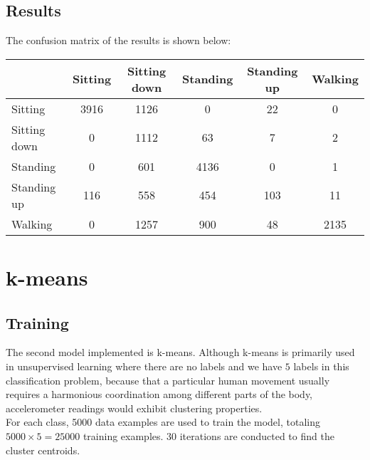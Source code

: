 \documentclass[a4paper, 11pt]{article}
\begin{document}
\subsection{Results}
The confusion matrix of the results is shown below:

\begin{table}[!h]
  \renewcommand{\arraystretch}{1.5}
  \begin{tabular}[<+position+>]{l|c|c|c|c|c}
    & Sitting & Sitting down & Standing & Standing up & Walking \\ \hline
    Sitting & 3916 & 1126 & 0 & 22 & 0 \\
    Sitting down & 0 & 1112 & 63 & 7 & 2 \\
    Standing & 0 & 601 & 4136 & 0 & 1 \\
    Standing up & 116 & 558 & 454 & 103 & 11 \\
    Walking & 0 & 1257 & 900 & 48 & 2135
  \end{tabular}
\end{table}




\section{k-means}
\subsection{Training}
The second model implemented is k-means. Although k-means is primarily used in unsupervised learning where there are no labels and we have $5$ labels in this classification problem, because that a particular human movement usually requires a harmonious coordination among different parts of the body, accelerometer readings would exhibit clustering properties. \\
For each class, 5000 data examples are used to train the model, totaling $5000 \times 5 = 25000$ training examples. $30$ iterations are conducted to find the cluster centroids.
\end{document}
